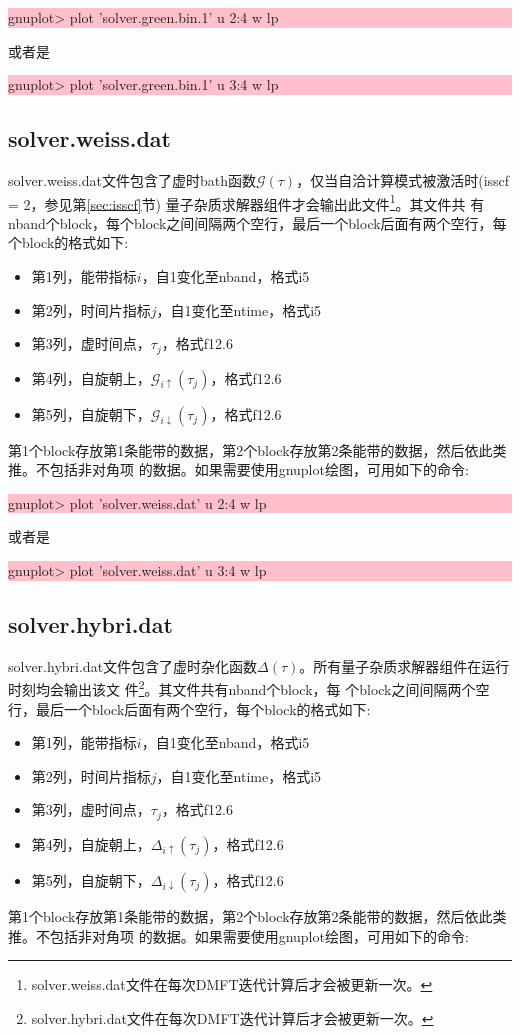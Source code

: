 \noindent\colorbox{pink}{\parbox[r]{\linewidth}{\quad gnuplot> plot 'solver.green.bin.1' u 2:4 w lp }}

或者是

\noindent\colorbox{pink}{\parbox[r]{\linewidth}{\quad gnuplot> plot 'solver.green.bin.1' u 3:4 w lp }}

\subsection{solver.weiss.dat}
solver.weiss.dat文件包含了虚时bath函数$\mathcal{G}(\tau)$，仅当自洽计算模式被激活时(isscf = 2，参见第\ref{sec:isscf}节)
量子杂质求解器组件才会输出此文件\footnote{solver.weiss.dat文件在每次DMFT迭代计算后才会被更新一次。}。其文件共
有nband个block，每个block之间间隔两个空行，最后一个block后面有两个空行，每个block的格式如下:
\begin{itemize}
\item 第1列，能带指标$i$，自1变化至nband，格式i5
\item 第2列，时间片指标$j$，自1变化至ntime，格式i5
\item 第3列，虚时间点，$\tau_{j}$，格式f12.6
\item 第4列，自旋朝上，$\mathcal{G}_{i\uparrow}(\tau_{j})$，格式f12.6
\item 第5列，自旋朝下，$\mathcal{G}_{i\downarrow}(\tau_{j})$，格式f12.6
\end{itemize}
第1个block存放第1条能带的数据，第2个block存放第2条能带的数据，然后依此类推。不包括非对角项
的数据。如果需要使用gnuplot绘图，可用如下的命令:

\noindent\colorbox{pink}{\parbox[r]{\linewidth}{\quad gnuplot> plot 'solver.weiss.dat' u 2:4 w lp }}

或者是

\noindent\colorbox{pink}{\parbox[r]{\linewidth}{\quad gnuplot> plot 'solver.weiss.dat' u 3:4 w lp }}

\subsection{solver.hybri.dat}
solver.hybri.dat文件包含了虚时杂化函数$\Delta(\tau)$。所有量子杂质求解器组件在运行时刻均会输出该文
件\footnote{solver.hybri.dat文件在每次DMFT迭代计算后才会被更新一次。}。其文件共有nband个block，每
个block之间间隔两个空行，最后一个block后面有两个空行，每个block的格式如下:
\begin{itemize}
\item 第1列，能带指标$i$，自1变化至nband，格式i5
\item 第2列，时间片指标$j$，自1变化至ntime，格式i5
\item 第3列，虚时间点，$\tau_{j}$，格式f12.6
\item 第4列，自旋朝上，$\Delta_{i\uparrow}(\tau_{j})$，格式f12.6
\item 第5列，自旋朝下，$\Delta_{i\downarrow}(\tau_{j})$，格式f12.6
\end{itemize}
第1个block存放第1条能带的数据，第2个block存放第2条能带的数据，然后依此类推。不包括非对角项
的数据。如果需要使用gnuplot绘图，可用如下的命令:

